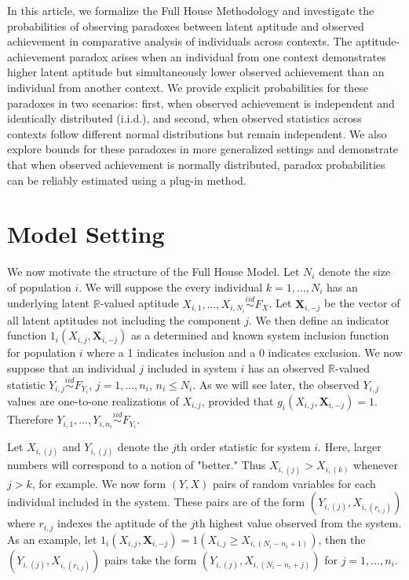 \documentclass[12pt]{article}
\newcommand{\R}{\mathbb{R}}
\begin{document}
In this article, we formalize the Full House Methodology and investigate the probabilities of observing paradoxes between latent aptitude and observed achievement in comparative analysis of individuals across contexts. The aptitude-achievement  paradox arises when an individual from one context demonstrates higher latent aptitude but simultaneously lower observed achievement than an individual from another context. We provide explicit probabilities for these paradoxes in two scenarios: first, when observed achievement is independent and identically distributed (i.i.d.), and second, when observed statistics across contexts follow different normal distributions but remain independent. We also explore bounds for these paradoxes in more generalized settings and demonstrate that when observed achievement is normally distributed, paradox probabilities can be reliably estimated using a plug-in method.


\section*{Model Setting}

We now motivate the structure of the Full House Model. Let $N_i$ denote the size of population $i$. We will suppose the every individual $k = 1,\ldots, N_i$ has an underlying latent $\R$-valued aptitude 
$X_{i,1}, \ldots, X_{i,N_i} \overset{iid}{\sim} F_{X}$. Let $\textbf{X}_{i,-j}$ be the vector of all latent aptitudes not including the component $j$. We then define an indicator function $1_{i}\left(X_{i,j},\textbf{X}_{i,-j}\right)$ as a determined and known system inclusion function for population $i$ where a 1 indicates inclusion and a 0 indicates exclusion. 
We now suppose that an individual $j$ included in system $i$ has an observed $\R$-valued statistic $Y_{i,j} \overset{iid}{\sim} F_{Y_i}$, $j = 1,\ldots,n_i$, $n_i \leq N_i$. As we will see later, the observed $Y_{i,j}$ values are one-to-one realizations of $X_{i,j}$, provided that $g_{i}\left(X_{i,j}, \textbf{X}_{i,-j}\right)=1$. Therefore $Y_{i,1}, \ldots, Y_{i,n_i} \overset{iid}{\sim} F_{Y_i}$. 

Let $X_{i,(j)}$ and $Y_{i,(j)}$ denote the $j$th order statistic for system $i$. Here, larger numbers will correspond to a notion of "better." Thus $X_{i,(j)} > X_{i,(k)}$ whenever $j>k$, for example. We now form $(Y,X)$ pairs of random variables for each individual included in the system. These pairs are of the form $(Y_{i,(j)}, X_{i,(r_{i,j})})$ where $r_{i,j}$ indexes the aptitude of the $j$th highest value observed from the system. As an example, let $1_{i}\left(X_{i,j}, \textbf{X}_{i,-j}\right) = 1(X_{i,j} \geq X_{i,(N_i-n_i+1)})$, then the $(Y_{i,(j)}, X_{i,(r_{i,j})})$ pairs take the form $(Y_{i,(j)}, X_{i,(N_i - n_i + j)})$ for $j = 1,\ldots,n_i$.
\end{document}
